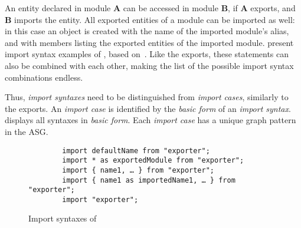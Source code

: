 An entity declared in module \textbf{A} can be accessed in module \textbf{B}, if \textbf{A} exports, and \textbf{B} imports the entity. All exported entities of a module can be imported as well: in this case an object is created with the name of the imported module's alias, and with members listing the exported entities of the imported module.  present import syntax examples of , based on~\cite{import-syntaxes}. Like the exports, these statements can also be combined with each other, making the list of the possible import syntax combinations endless.

Thus, \emph{import syntaxes} need to be distinguished from \emph{import cases}, similarly to the exports. An \emph{import case} is identified by the \emph{basic form} of an \emph{import syntax}.  displays all syntaxes in \emph{basic form}. Each \emph{import case} has a unique graph pattern in the ASG.

\vspace{1em}
\begin{figure}[!htb]
	\centering
	\begin{minipage}{35em}
		\begin{verbatim}
		import defaultName from "exporter";
		import * as exportedModule from "exporter";
		import { name1, … } from "exporter";
		import { name1 as importedName1, … } from "exporter";
		import "exporter";
		\end{verbatim}
	\end{minipage}
  \caption{Import syntaxes of }
  \label{fig:import-syntaxes}
\end{figure}